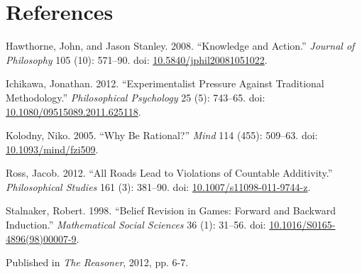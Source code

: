 \documentclass[
  10pt,
  letterpaper,
  DIV=11,
  numbers=noendperiod,
  twoside]{scrartcl}
\newlength{\cslhangindent}
\newenvironment{CSLReferences}[2] %
 {\begin{list}{}{%
  \setlength{\itemindent}{0pt}
  \setlength{\leftmargin}{0pt}
  \setlength{\parsep}{0pt}
  \ifodd #1
   \setlength{\leftmargin}{\cslhangindent}
   \setlength{\itemindent}{-1\cslhangindent}
  \fi
  \setlength{\itemsep}{#2\baselineskip}}}
 {\end{list}}
\begin{document}
\section*{References}\label{references}

\label{refs}
\begin{CSLReferences}{1}{0}
Hawthorne, John, and Jason Stanley. 2008. {``{Knowledge and Action}.''}
\emph{Journal of Philosophy} 105 (10): 571--90. doi:
\href{https://doi.org/10.5840/jphil20081051022}{10.5840/jphil20081051022}.

Ichikawa, Jonathan. 2012. {``Experimentalist Pressure Against
Traditional Methodology.''} \emph{Philosophical Psychology} 25 (5):
743--65. doi:
\href{https://doi.org/10.1080/09515089.2011.625118}{10.1080/09515089.2011.625118}.

Kolodny, Niko. 2005. {``Why Be Rational?''} \emph{Mind} 114 (455):
509--63. doi:
\href{https://doi.org/10.1093/mind/fzi509}{10.1093/mind/fzi509}.

Ross, Jacob. 2012. {``All Roads Lead to Violations of Countable
Additivity.''} \emph{Philosophical Studies} 161 (3): 381--90. doi:
\href{https://doi.org/10.1007/s11098-011-9744-z}{10.1007/s11098-011-9744-z}.

Stalnaker, Robert. 1998. {``Belief Revision in Games: Forward and
Backward Induction.''} \emph{Mathematical Social Sciences} 36 (1):
31--56. doi:
\href{https://doi.org/10.1016/S0165-4896(98)00007-9}{10.1016/S0165-4896(98)00007-9}.

\end{CSLReferences}



\noindent Published in\emph{
The Reasoner}, 2012, pp. 6-7.
\end{document}
